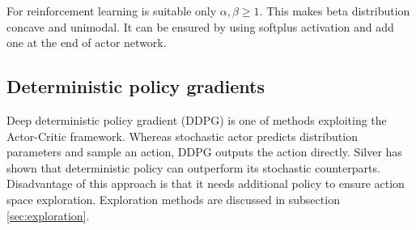 For reinforcement learning is suitable only $\alpha, \beta \geq 1$. This makes beta distribution concave and unimodal. It can be ensured by using softplus activation and add one at the end of actor network.

\subsection{Deterministic policy gradients}
Deep deterministic policy gradient (DDPG) is one of methods exploiting the Actor-Critic framework. Whereas stochastic actor predicts distribution parameters and sample an action, DDPG outputs the action directly. Silver \cite{silver2014} has shown that deterministic policy can outperform its stochastic counterparts. Disadvantage of this approach is that it needs additional policy to ensure action space exploration. Exploration methods are discussed in subsection \ref{sec:exploration}.


